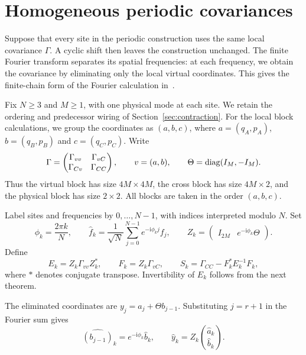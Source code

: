 \section{Homogeneous periodic covariances}\label{sec:fourier}
Suppose that every site in the periodic construction uses the same local
covariance $\Gamma$. A cyclic shift then leaves the construction unchanged.
The finite Fourier transform separates its spatial frequencies: at each
frequency, we obtain the covariance by eliminating only the local virtual
coordinates. This gives the finite-chain form of the Fourier calculation
in~\cite[Sec.~6]{schuch}.

Fix $N\geq3$ and $M\geq1$, with one physical mode at each site. We retain the
ordering and predecessor wiring of Section~\ref{sec:contraction}.
For the local block calculations, we group the coordinates as $(a,b,c)$, where
$a=(q_A,p_A)$, $b=(q_B,p_B)$ and $c=(q_C,p_C)$. Write
\[
 \Gamma=\begin{pmatrix}\Gamma_{vv}&\Gamma_{vC}\\
                         \Gamma_{Cv}&\Gamma_{CC}\end{pmatrix},
 \qquad v=(a,b),\qquad \Theta=\operatorname{diag}(I_M,-I_M).
\]
Thus the virtual block has size $4M\times4M$, the cross block has size
$4M\times2$, and the physical block has size $2\times2$.
All blocks are taken in the order $(a,b,c)$.

\begin{definition}\label{def:fourier-blocks}
Label sites and frequencies by $0,\ldots,N-1$, with indices interpreted
modulo $N$. Set
\[
 \phi_k=\frac{2\pi k}{N},\qquad
 \widehat f_k=\frac1{\sqrt N}\sum_{j=0}^{N-1}e^{-\mathrm i\phi_kj}f_j,
 \qquad Z_k=\begin{pmatrix}I_{2M}&e^{-\mathrm i\phi_k}\Theta\end{pmatrix}.
\]
Define
\begin{equation}\label{eq:fourier-schur}
 E_k=Z_k\Gamma_{vv}Z_k^*,\qquad F_k=Z_k\Gamma_{vC},\qquad
 S_k=\Gamma_{CC}-F_k^*E_k^{-1}F_k,
\end{equation}
where $*$ denotes conjugate transpose. Invertibility of $E_k$ follows from
the next theorem.
\end{definition}
The eliminated coordinates are $y_j=a_j+\Theta b_{j-1}$. Substituting
$j=r+1$ in the Fourier sum gives
\[
 \widehat{(b_{j-1})}_k=e^{-\mathrm i\phi_k}\widehat b_k,
 \qquad \widehat y_k=Z_k\binom{\widehat a_k}{\widehat b_k}.
\]

